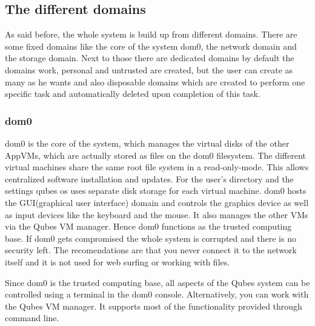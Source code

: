 \documentclass[runningheads,a4paper]{article}
\begin{document}
\subsection{The different domains}
As said before, the whole system is build up from different
domains. There are some fixed domains like the core of the system
dom0, the network domain and the storage domain. Next to those there
are dedicated domains by default the domains work, personal and
untrusted are created, but the user can create as many as he wants and
also disposable domains which are created to perform one specific task
and automatically deleted upon completion of this task.

\subsubsection{dom0}

dom0 is the core of the system, which manages the virtual disks of the
other AppVMs, which are actually stored as files on the dom0
filesystem. The different virtual machines share the same root file
system in a read-only-mode. This allows centralized software
installation and updates. For the user's directory and the settings
qubes os uses separate disk storage for each virtual machine. 
dom0 hosts the GUI(graphical user interface) domain and controls the
graphics device as well as input devices like the keyboard and the
mouse. It also manages the other VMs via the Qubes VM manager. Hence
dom0 functions as the trusted computing base. If dom0 gets compromised
the whole system is corrupted and there is no security left. The
recomendations are that you never connect it to the network itself and
it is not used for web surfing or working with files.

Since dom0 is the trusted computing base, all aspects of the Qubes
system can be controlled using a terminal in the dom0 console. 
Alternatively, you can work with the Qubes VM
manager. It supports most of the functionality provided through
command line. 
\end{document}
